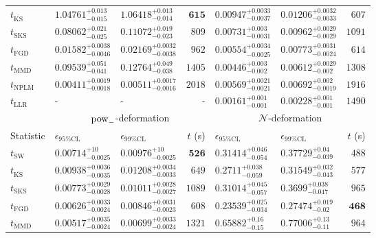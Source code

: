 \begin{tabular}{l|llr|llr}
	$t_{\overline{\mathrm{KS}}}$ & $1.04761_{-0.015}^{+0.013}$ & $1.06418_{-0.014}^{+0.013}$ & ${\mathbf{615}}$ & $0.00947_{-0.0037}^{+0.0033}$ & $0.01206_{-0.0033}^{+0.0032}$ & $607$ \\
	$t_{\mathrm{SKS}}$ & $0.08062_{-0.025}^{+0.021}$ & $0.11072_{-0.023}^{+0.019}$ & $809$ & $0.00731_{-0.0031}^{+0.003}$ & $0.00962_{-0.0029}^{+0.0029}$ & $1091$ \\
	$t_{\mathrm{FGD}}$ & ${\mathbf{0.01582_{-0.0046}^{+0.0038}}}$ & ${\mathbf{0.02169_{-0.0038}^{+0.0032}}}$ & $962$ & $0.00554_{-0.0025}^{+0.0034}$ & $0.00773_{-0.0024}^{+0.0031}$ & $614$ \\
	$t_{\mathrm{MMD}}$ & $0.09539_{-0.041}^{+0.051}$ & $0.12764_{-0.038}^{+0.049}$ & $1405$ & ${\mathbf{0.00446_{-0.002}^{+0.003}}}$ & ${\mathbf{0.00612_{-0.002}^{+0.0029}}}$ & $1308$ \\
\rowcolor{red!35}	$t_{\mathrm{NPLM}}$ & $0.00411_{-0.0018}^{+0.0019}$ & $0.00511_{-0.0016}^{+0.0017}$ & $2018$ & $0.00569_{-0.0021}^{+0.0021}$ & $0.00692_{-0.0019}^{+0.002}$ & $1916$ \\
	$t_{\mathrm{LLR}}$ & - & - & - & $0.00161_{-0.001}^{+0.001}$ & $0.00228_{-0.001}^{+0.001}$ & $1490$ \\
	\toprule
	\multicolumn{1}{c}{} & \multicolumn{3}{c}{$\rm{pow}_{-}$-deformation} & \multicolumn{3}{c}{$\mathcal{N}$-deformation} \\
	Statistic & $\epsilon_{95\%\mathrm{CL}}$ & $\epsilon_{99\%\mathrm{CL}}$ & $t$ (s) & $\epsilon_{95\%\mathrm{CL}}$ & $\epsilon_{99\%\mathrm{CL}}$ & $t$ (s) \\
	\midrule
	$t_{\mathrm{SW}}$ & $0.00714_{-0.0025}^{+10}$ & $0.00976_{-0.0025}^{+10}$ & ${\mathbf{526}}$ & $0.31414_{-0.054}^{+0.046}$ & $0.37729_{-0.039}^{+0.04}$ & $488$ \\
	$t_{\overline{\mathrm{KS}}}$ & $0.00938_{-0.0035}^{+0.0036}$ & $0.01208_{-0.0033}^{+0.0034}$ & $649$ & $0.2711_{-0.059}^{+0.038}$ & $0.31549_{-0.043}^{+0.032}$ & $577$ \\
	$t_{\mathrm{SKS}}$ & $0.00773_{-0.0028}^{+0.0029}$ & $0.01011_{-0.0027}^{+0.0028}$ & $1089$ & $0.31014_{-0.057}^{+0.045}$ & $0.3699_{-0.047}^{+0.038}$ & $965$ \\
	$t_{\mathrm{FGD}}$ & $0.00626_{-0.0024}^{+0.0033}$ & $0.00846_{-0.0023}^{+0.0031}$ & $608$ & ${\mathbf{0.23539_{-0.034}^{+0.025}}}$ & ${\mathbf{0.27474_{-0.02}^{+0.019}}}$ & ${\mathbf{468}}$ \\
	$t_{\mathrm{MMD}}$ & ${\mathbf{0.00517_{-0.0024}^{+0.0035}}}$ & ${\mathbf{0.00699_{-0.0024}^{+0.0033}}}$ & $1321$ & $0.65882_{-0.15}^{+0.16}$ & $0.77006_{-0.11}^{+0.13}$ & $964$ \\

\end{tabular}
